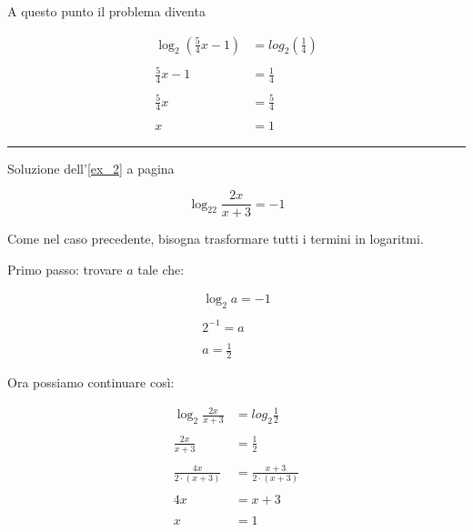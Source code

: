 A questo punto il problema diventa

\begin{equation*}
\begin{split}
\log_2\left(\frac{5}{4}x-1\right)&=log_2\left(\frac{1}{4}\right) \\
\\
\frac{5}{4}x-1&=\frac{1}{4} \\
\\
\frac{5}{4}x&=\frac{5}{4} \\
\\
x&=1
\end{split}
\end{equation*}

\vspace{1cm}
\hrule
\vspace{1cm}

Soluzione dell'\ref{ex_2} a pagina \pageref{ex_2}\label{sol_2}

\begin{equation*}
\log_22\frac{2x}{x+3}=-1
\end{equation*}



Come nel caso precedente, bisogna trasformare tutti i termini in logaritmi.


Primo passo: trovare $a$ tale che:

\begin{equation*}
\begin{split}
\log_2a=-1\\
\\
2^{-1}=a\\
\\
a=\frac{1}{2}
\end{split}
\end{equation*}

Ora possiamo continuare così:

\begin{equation*}
\begin{split}
\log_2\frac{2x}{x+3}&=log_2\frac{1}{2} \\
\\
\frac{2x}{x+3}&=\frac{1}{2} \\
\\
\frac{4x}{2\cdot(x+3)}&=\frac{x+3}{2\cdot(x+3)} \\
\\
4x&=x+3 \\
\\
x&=1
\end{split}
\end{equation*}



